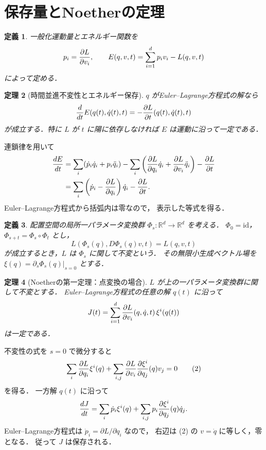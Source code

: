 \documentclass[a5paper,10pt,onecolumn]{jsarticle}
\makeatletter
\theoremstyle{mathnotetheorem}
\newtheorem{theorem}{定理}[section]
\newtheorem{definition}[theorem]{定義}
\renewcommand{\proofname}{証明}
\renewenvironment{proof}[1][\proofname]{%
  \par\pushQED{\qed}\normalfont\topsep4\p@\@plus2\p@\relax
  \trivlist\item[\hskip\labelsep\bfseries #1]\ignorespaces
}{\popQED\endtrivlist\@endpefalse}
\makeatother
\begin{document}
\section{保存量とNoetherの定理}
\begin{definition}
一般化運動量とエネルギー関数を
\[
 p_i={\partial L\over\partial v_i},\qquad
 E(q,v,t)=\sum_{i=1}^dp_iv_i-L(q,v,t)
\]
によって定める．
\end{definition}
\begin{theorem}[時間並進不変性とエネルギー保存]\label{thm:energy}
$q$ がEuler--Lagrange方程式の解なら
\[
 {d\over dt}E(q(t),\dot q(t),t)
 =-{\partial L\over\partial t}(q(t),\dot q(t),t)
\]
が成立する．特に $L$ が $t$ に陽に依存しなければ
$E$ は運動に沿って一定である．
\end{theorem}
\begin{proof}
連鎖律を用いて
\[
 \begin{aligned}
 {dE\over dt}
 &=\sum_i(\dot p_i\dot q_i+p_i\ddot q_i)
 -\sum_i\left(
 {\partial L\over\partial q_i}\dot q_i+
 {\partial L\over\partial v_i}\ddot q_i
 \right)-{\partial L\over\partial t}\\
 &=\sum_i
 \left(\dot p_i-{\partial L\over\partial q_i}\right)\dot q_i
 -{\partial L\over\partial t}.
 \end{aligned}
\]
Euler--Lagrange方程式から括弧内は零なので，
表示した等式を得る．
\end{proof}
\begin{definition}
配置空間の局所一パラメータ変換群
$\Phi_s:\mathbb R^d\to\mathbb R^d$ を考える．
$\Phi_0=\mathrm{id}$，
$\Phi_{s+t}=\Phi_s\circ\Phi_t$ とし，
\[
 L(\Phi_s(q),D\Phi_s(q)v,t)=L(q,v,t)
\]
が成立するとき，$L$ は $\Phi_s$ に関して不変という．
その無限小生成ベクトル場を
$\xi(q)=\left.\partial_s\Phi_s(q)\right|_{s=0}$ とする．
\end{definition}
\begin{theorem}[Noetherの第一定理：点変換の場合]\label{thm:noether}
$L$ が上の一パラメータ変換群に関して不変とする．
Euler--Lagrange方程式の任意の解 $q(t)$ に沿って
\[
 J(t)=\sum_{i=1}^d
 {\partial L\over\partial v_i}(q,\dot q,t)\,
 \xi^i(q(t))
\]
は一定である．
\end{theorem}
\begin{proof}
不変性の式を $s=0$ で微分すると
\[
 \sum_i{\partial L\over\partial q_i}\xi^i(q)
 +\sum_{i,j}{\partial L\over\partial v_i}
 {\partial\xi^i\over\partial q_j}(q)v_j=0
 \tag{2}
\]
を得る．
一方解 $q(t)$ に沿って
\[
 {dJ\over dt}
 =\sum_i\dot p_i\xi^i(q)
 +\sum_{i,j}p_i{\partial\xi^i\over\partial q_j}(q)\dot q_j.
\]
Euler--Lagrange方程式は
$\dot p_i=\partial L/\partial q_i$ なので，
右辺は (2) の $v=\dot q$ に等しく，零となる．
従って $J$ は保存される．
\end{proof}
\end{document}
